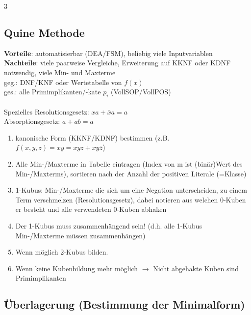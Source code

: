 \documentclass[6pt,a4paper]{scrartcl}
\newcommand{\ra}[0]{\ensuremath{\rightarrow}} 									%
\begin{document}
\begin{multicols*}{3}

	\subsection{Quine Methode}
	\textbf{Vorteile}: automatisierbar (DEA/FSM), beliebig viele Inputvariablen\\
	\textbf{Nachteile}: viele paarweise Vergleiche, Erweiterung auf KKNF oder KDNF notwendig, viele Min- und Maxterme\\
	geg.: DNF/KNF oder Wertetabelle von $f(x)$ \\
	ges.: alle Primimplikanten/-kate $p_i$ (VollSOP/VollPOS)  \\ \\
	Spezielles Resolutionsgesetz: $x a + \overline x a = a$ \\
	Absorptionsgesetz: $a + a b = a$

	\begin{enumerate}
		\item kanonische Form (KKNF/KDNF) bestimmen (z.B. $f(x,y,z) = xy = xyz + xy\overline z$)
		\item Alle Min-/Maxterme in Tabelle eintragen (Index von m ist (binär)Wert des Min-/Maxterms), sortieren nach der Anzahl der positiven Literale (=Klasse)
		\item 1-Kubus: Min-/Maxterme die sich um eine Negation unterscheiden, zu einem Term verschmelzen (Resolutionsgesetz), dabei notieren aus welchen 0-Kuben er besteht und alle verwendeten 0-Kuben abhaken
		\item Der 1-Kubus muss zusammenhängend sein! (d.h. alle 1-Kubus Min-/Maxterme müssen zusammenhängen)
		\item Wenn möglich 2-Kubus bilden.
		\item Wenn keine Kubenbildung mehr möglich $\ra$ Nicht abgehakte Kuben sind Primimplikanten
	\end{enumerate}

	\subsection{Überlagerung (Bestimmung der Minimalform)}

\end{multicols*}
\end{document}
